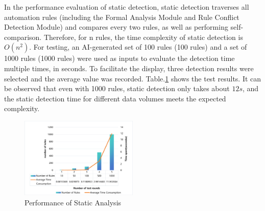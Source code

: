 In the performance evaluation of static detection, static detection traverses all automation rules (including the Formal Analysis Module and Rule Conflict Detection Module) and compares every two rules, as well as performing self-comparison. Therefore, for n rules, the time complexity of static detection is $O\left(n^2\right)$. For testing, an AI-generated set of 100 rules (100 rules) and a set of 1000 rules (1000 rules) were used as inputs to evaluate the detection time multiple times, in seconds. To facilitate the display, three detection results were selected and the average value was recorded. Table.\ref{performance_static_analysis} shows the test results. It can be observed that even with 1000 rules, static detection only takes about $12s$, and the static detection time for different data volumes meets the expected complexity.

\begin{figure}[htbp]
	\caption{Performance of Static Analysis}
	\label{performance_static_analysis}
	\includegraphics[width=0.5\textwidth]{figure/performance.png}
	
\end{figure}

